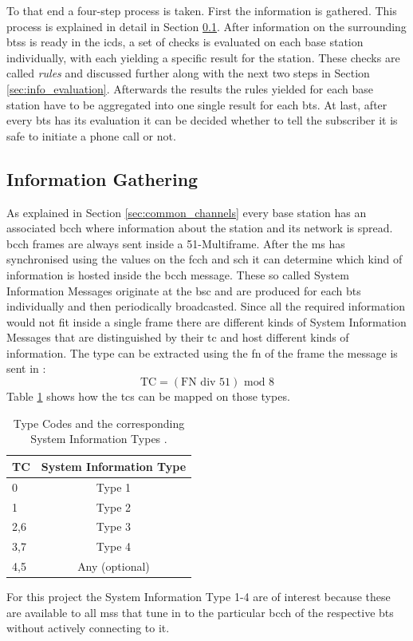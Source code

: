 To that end a four-step process is taken.
First the information is gathered.
This process is explained in detail in Section \ref{sec:info_gathering}.
After information on the surrounding \glspl{bts} is ready in the \gls{icds}, a set of checks is evaluated on each base station individually, with each yielding a specific result for the station.
These checks are called \emph{rules} and discussed further along with the next two steps in Section \ref{sec:info_evaluation}.
Afterwards the results the rules yielded for each base station have to be aggregated into one single result for each \gls{bts}.
At last, after every \gls{bts} has its evaluation it can be decided whether to tell the subscriber it is safe to initiate a phone call or not.

\subsection{Information Gathering}
\label{sec:info_gathering}
As explained in Section \ref{sec:common_channels} every base station has an associated \gls{bcch} where information about the station and its network is spread.
\gls{bcch} frames are always sent inside a 51-Multiframe.
After the \gls{ms} has synchronised using the values on the \gls{fcch} and \gls{sch} it can determine which kind of information is hosted inside the \gls{bcch} message.
These so called System Information Messages originate at the \gls{bsc} and are produced for each \gls{bts} individually and then periodically broadcasted.
Since all the required information would not fit inside a single frame there are different kinds of System Information Messages that are distinguished by their \gls{tc} and host different kinds of information.
The type can be extracted using the \gls{fn} of the frame the message is sent in \cite{GSM2009}:
\[\text{TC}=(\text{FN} \text{ div } 51)\text{ mod } 8\]
Table \ref{tab:tc_mapping} shows how the \glspl{tc} can be mapped on those types.
\begin{table}
\centering
\begin{tabular}{lc}
\toprule
TC		&System Information Type\\
\midrule
0		&Type 1\\
1		&Type 2\\
2,6		&Type 3\\
3,7		&Type 4\\
4,5		&Any (optional)\\
\bottomrule
\end{tabular}
\caption{Type Codes and the corresponding System Information Types \cite{GSM2009}.}
\label{tab:tc_mapping}
\end{table}
For this project the System Information Type 1-4 are of interest because these are available to all \glspl{ms} that tune in to the particular \gls{bcch} of the respective \gls{bts} without actively connecting to it.

